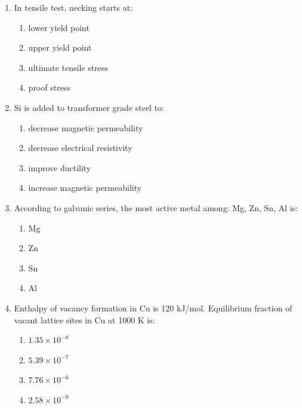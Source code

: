 \documentclass[journal,cmex10]{IEEEtran}
\theoremstyle{remark}
\numberwithin{equation}{enumi}
\numberwithin{figure}{enumi}
\begin{document}
\begin{enumerate}[label=\arabic*)]
\vspace{0.5cm}
\item  In tensile test, necking starts at:  
\hfill{}
\begin{enumerate}[label=\alph*)]
    \item lower yield point
    \item upper yield point
    \item ultimate tensile stress
    \item proof stress
\end{enumerate}

\vspace{0.5cm}
\item Si is added to transformer grade steel to:  
\hfill{}
\begin{enumerate}[label=\alph*)]
    \item decrease magnetic permeability
    \item decrease electrical resistivity
    \item improve ductility
    \item increase magnetic permeability
\end{enumerate}

\newpage
\item According to galvanic series, the most active metal among: Mg, Zn, Sn, Al is:
\vspace{0.2cm}
\hfill{}
\begin{enumerate}[label=\alph*)]
    \item Mg
    \item Zn
    \item Sn
    \item Al
\end{enumerate}

\vspace{0.5cm}
\item Enthalpy of vacancy formation in Cu is 120 kJ/mol. Equilibrium fraction of vacant lattice sites in Cu at 1000 K is: 
\hfill{}
\begin{enumerate}[label=\alph*)]
    \item $1.35 \times 10^{-8}$
    \item $5.39 \times 10^{-7}$
    \item $7.76 \times 10^{-6}$
    \item $2.58 \times 10^{-9}$
\end{enumerate}


\end{enumerate}
\end{document}
